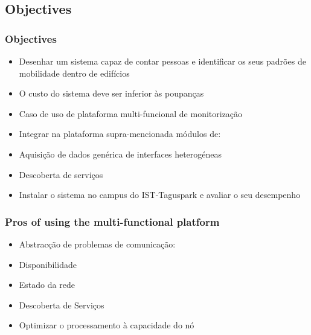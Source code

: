 \documentclass[]{beamer}
\begin{document}
\subsection{Objectives}

\begin{frame}
  \frametitle{Objectives}   %

  \begin{itemize}
	\item Desenhar um sistema capaz de contar pessoas e identificar os seus padrões de mobilidade dentro de edifícios
	\item O custo do sistema deve ser inferior às poupanças
	\item Caso de uso de plataforma multi-funcional de monitorização

	\item Integrar na plataforma supra-mencionada módulos de:
	\item Aquisição de dados genérica de interfaces heterogéneas
	\item Descoberta de serviços

	\item Instalar o sistema no campus do IST-Taguspark e avaliar o seu desempenho
  \end{itemize}
\end{frame}

\begin{frame}
  \frametitle{Pros of using the multi-functional platform}   %

  \begin{itemize}
	\item Abstracção de problemas de comunicação:
	\item Disponibilidade
	\item Estado da rede
	\item Descoberta de Serviços

	\item Optimizar o processamento à capacidade do nó
  \end{itemize}
\end{frame}
\end{document}
